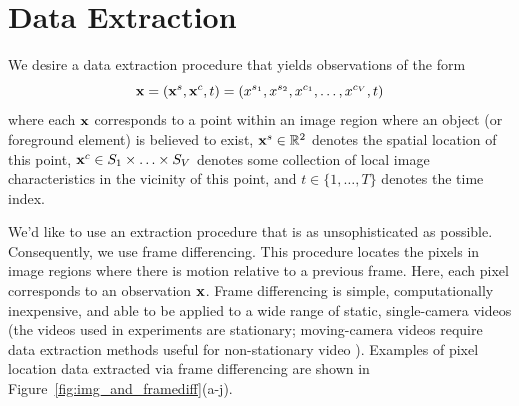 \documentclass[twocolumn, final]{svjour3}
\begin{document}

\section{Data Extraction}
\label{sec:dataextraction}


We desire a data extraction procedure that yields observations of the form
\begin{equation}
\centering
\bold{x} = ( \bold{x}^{s}, \bold{x}^{c}, t ) = ( x^{s_{1}}, x^{s_{2}}, x^{c_{1}}, \ldots, x^{c_{V}}, t )
\end{equation}
where each $\bold{x}$ corresponds to a point within an image region where an object (or foreground element)  is believed to exist, $\bold{x}^{s} \in \mathbb{R}^{2}$ denotes the spatial location of this point, $\bold{x}^{c} \in S_{1} \times \ldots \times S_{V}$ denotes some collection of local image characteristics in the vicinity of this point, and $t \in \{1, \ldots, T \}$ denotes the time index.

We'd like to use an extraction procedure that is as unsophisticated as possible. Consequently, we use frame differencing. This procedure locates the pixels in image regions where there is motion relative to a previous frame. Here, each pixel corresponds to an observation $\bold{x}$. Frame differencing is simple, computationally inexpensive, and able to be applied to a wide range of static, single-camera videos (the videos used in experiments are stationary; moving-camera videos require data extraction methods useful for non-stationary video \cite{chien2002efficient, zhang2007moving}). Examples of pixel location data extracted via frame differencing are shown in Figure~\ref{fig:img_and_framediff}(a-j).
\end{document}

